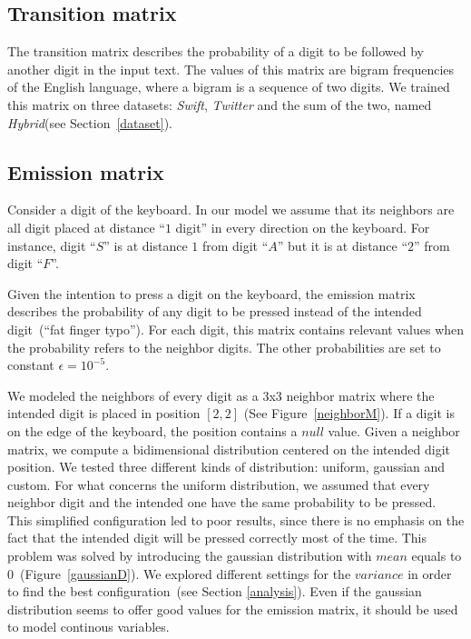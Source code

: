 \documentclass[12pt]{article}
\begin{document}
\subsection{Transition matrix}\label{transitionM}

The transition matrix describes the probability of a digit to be followed by
another digit in the input text. The values of this matrix are bigram
frequencies of the English language, where a bigram is a sequence of two digits.
We trained this matrix on three datasets: \emph{Swift}, \emph{Twitter} and the
sum of the two, named \emph{Hybrid}(see Section~\ref{dataset}).
\subsection{Emission matrix}\label{emissionM}
Consider a digit of the keyboard. In our model we assume that its neighbors are
all digit placed at distance ``$1$ digit'' in every direction on the keyboard.
For instance, digit ``$S$'' is at distance $1$ from digit ``$A$'' but it is at distance ``$2$'' from
digit ``$F$''.

Given the intention to press a digit on the keyboard, the emission matrix
describes the probability of any digit to be pressed instead of the intended
digit~(``fat finger typo'').
For each digit, this matrix contains relevant values when the probability refers to the neighbor digits. The other
probabilities are set to constant $\epsilon = 10^{-5}$.

We modeled the neighbors of every digit as a $3$x$3$ neighbor matrix
where the intended digit is placed in position $[2, 2]$ (See
Figure~\ref{neighborM}). If a digit is on the edge of the keyboard, the position
contains a $null$ value. Given a neighbor matrix, we compute a bidimensional
distribution centered on the intended digit position.
We tested three different kinds of distribution: uniform, gaussian and custom.
For what concerns the uniform distribution, we assumed that every neighbor digit
and the intended one have the same probability to be pressed. This
simplified configuration led to poor results, since there is no emphasis on the
fact that the intended digit will be pressed correctly most of the time.
This problem was solved by introducing the gaussian distribution with $mean$
equals to $0$~(Figure~\ref{gaussianD}). We explored different settings for the
$variance$ in order to find the best configuration~(see Section \ref{analysis}). Even if the gaussian
distribution seems to offer good values for the emission matrix, it should
be used to model continous variables.
\end{document}

